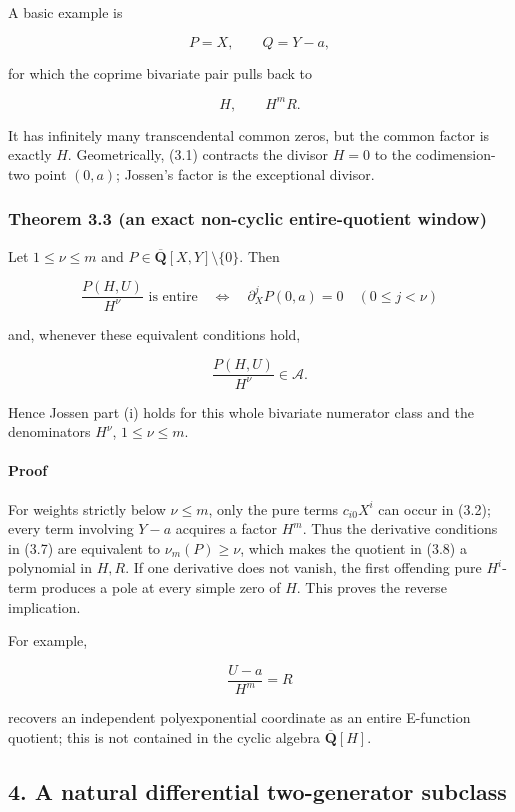 A basic example is

\[
  P=X,\qquad Q=Y-a,
\]

for which the coprime bivariate pair pulls back to

\[
  H,\qquad H^mR.
\]

It has infinitely many transcendental common zeros, but the common factor is
exactly \(H\). Geometrically, (3.1) contracts the divisor \(H=0\) to the
codimension-two point \((0,a)\); Jossen's factor is the exceptional divisor.

\subsubsection{Theorem 3.3 (an exact non-cyclic entire-quotient window)}

Let \(1\le\nu\le m\) and \(P\in\overline{\mathbf Q}[X,Y]\setminus\{0\}\).
Then

\[
 \frac{P(H,U)}{H^\nu}\text{ is entire}
 \quad\Longleftrightarrow\quad
 \partial_X^jP(0,a)=0\quad(0\le j<\nu)                     \tag{J-3.7}
\]

and, whenever these equivalent conditions hold,

\[
  \frac{P(H,U)}{H^\nu}\in\mathscr A.                        \tag{J-3.8}
\]

Hence Jossen part (i) holds for this whole bivariate numerator class and the
denominators \(H^\nu\), \(1\le\nu\le m\).

\paragraph{Proof}

For weights strictly below \(\nu\le m\), only the pure terms \(c_{i0}X^i\)
can occur in (3.2); every term involving \(Y-a\) acquires a factor \(H^m\).
Thus the derivative conditions in (3.7) are equivalent to
\(\nu_m(P)\ge\nu\), which makes the quotient in (3.8) a polynomial in
\(H,R\). If one derivative does not vanish, the first offending pure
\(H^i\)-term produces a pole at every simple zero of \(H\). This proves the
reverse implication.

For example,

\[
  \frac{U-a}{H^m}=R
\]

recovers an independent polyexponential coordinate as an entire E-function
quotient; this is not contained in the cyclic algebra
\(\overline{\mathbf Q}[H]\).

\subsection{4. A natural differential two-generator subclass}

